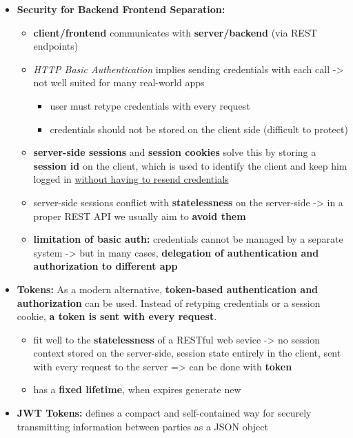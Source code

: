 \documentclass[ieeetran]{article}
\begin{document}
\begin{itemize}
\item \textbf{Security for Backend Frontend Separation:}
	\begin{itemize}
	  \item \textbf{client/frontend} communicates with \textbf{server/backend} (via REST endpoints)
	\item \textit{HTTP Basic Authentication} implies sending credentials with each call -> not well suited for many real-world apps
	\begin{itemize}
	  \item user must retype credentials with every request
	\item credentials should not be stored on the client side (difficult to protect)
	\end{itemize}
	\item \textbf{server-side sessions} and \textbf{session cookies} solve this by storing a \textbf{session id} on the client, which is used to identify the client and keep him logged in \underline{without having to resend credentials}
	\item server-side sessions conflict with \textbf{statelessness} on the server-side -> in a proper REST API we usually aim to \textbf{avoid them}

	\item \textbf{limitation of basic auth:} credentials cannot be managed by a separate system -> but in many cases, \textbf{delegation of authentication and authorization to different app}
	\end{itemize}

\item \textbf{Tokens:} As a modern alternative, \textbf{token-based authentication and authorization} can be used. Instead of retyping credentials or a session cookie, \textbf{a token is sent with every request}.
	\begin{itemize}
	  \item fit well to the \textbf{statelessness} of a RESTful web sevice -> no session context stored on the server-side, session state entirely in the client, sent with every request to the server => can be done with \textbf{token}
	\item has a \textbf{fixed lifetime}, when expires generate new
	\end{itemize}

\item \textbf{JWT Tokens:} defines a compact and self-contained way for securely transmitting information between parties as a JSON object


\end{itemize}
\end{document}
